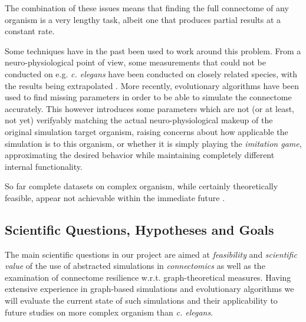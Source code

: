 \documentclass[a4paper,11pt]{article}
\begin{document}
The combination of these issues means that finding the full connectome of any organism is a very lengthy task, albeit one that produces partial results at a constant rate. 

Some techniques have in the past been used to work around this problem. From a neuro-physiological point of view, some measurements that could not be conducted on e.g. \emph{c. elegans} have been conducted on closely related species, with the results being extrapolated \citep{ThatBlueBook}. More recently, evolutionary algorithms have been used to find missing parameters in order to be able to simulate the connectome accurately. This however introduces some parameters which are not (or at least, not yet) verifyably matching the actual neuro-physiological makeup of the original simulation target organism, raising concerns about how applicable the simulation is to this organism, or whether it is simply playing the \emph{imitation game}, approximating the desired behavior while maintaining completely different internal functionality.

So far complete datasets on complex organism, while certainly theoretically feasible, appear not achievable within the immediate future \citep{Gjorgjieva2014} \citep{Mikula2016}.



\subsection{Scientific Questions, Hypotheses and Goals}

The main scientific questions in our project are aimed at \emph{feasibility} and \emph{scientific value} of the use of abstracted simulations in \emph {connectomics} as well as the examination of connectome resilience w.r.t. graph-theoretical measures. Having extensive experience in graph-based simulations and evolutionary algorithms we will evaluate the current state of such simulations and their applicability to future studies on more complex organism than \emph{c. elegans}.
\end{document}
